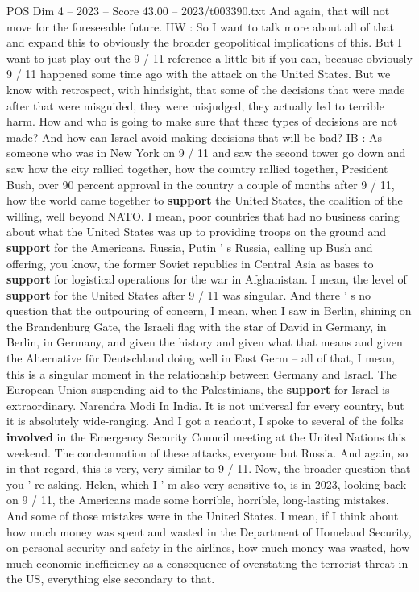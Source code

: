 \begin{textsample}{POS Dim 4 – 2023 – Score 43.00 – 2023/t003390.txt}
And again, that will not move for the foreseeable future.
HW : So I want to talk more about all of that and expand this to obviously the broader geopolitical implications of this.
But I want to just play out the 9 / 11 reference a little bit if you can, because obviously 9 / 11 happened some time ago with the attack on the United States.
But we know with retrospect, with hindsight, that some of the decisions that were made after that were misguided, they were misjudged, they actually led to terrible harm.
How and who is going to make sure that these types of decisions are not made?
And how can Israel avoid making decisions that will be bad?
IB : As someone who was in New York on 9 / 11 and saw the second tower go down and saw how the city rallied together, how the country rallied together, President Bush, over 90 percent approval in the country a couple of months after 9 / 11, how the world came together to \textbf{support} the United States, the coalition of the willing, well beyond NATO.
I mean, poor countries that had no business caring about what the United States was up to providing troops on the ground and \textbf{support} for the Americans.
Russia, Putin ' s Russia, calling up Bush and offering, you know, the former Soviet republics in Central Asia as bases to \textbf{support} for logistical operations for the war in Afghanistan.
I mean, the level of \textbf{support} for the United States after 9 / 11 was singular.
And there ' s no question that the outpouring of concern, I mean, when I saw in Berlin, shining on the Brandenburg Gate, the Israeli flag with the star of David in Germany, in Berlin, in Germany, and given the history and given what that means and given the Alternative für Deutschland doing well in East Germ -- all of that, I mean, this is a singular moment in the relationship between Germany and Israel.
The European Union suspending aid to the Palestinians, the \textbf{support} for Israel is extraordinary.
Narendra Modi In India.
It is not universal for every country, but it is absolutely wide-ranging.
And I got a readout, I spoke to several of the folks \textbf{involved} in the Emergency Security Council meeting at the United Nations this weekend.
The condemnation of these attacks, everyone but Russia.
And again, so in that regard, this is very, very similar to 9 / 11.
Now, the broader question that you ' re asking, Helen, which I ' m also very sensitive to, is in 2023, looking back on 9 / 11, the Americans made some horrible, horrible, long-lasting mistakes.
And some of those mistakes were in the United States.
I mean, if I think about how much money was spent and wasted in the Department of Homeland Security, on personal security and safety in the airlines, how much money was wasted, how much economic inefficiency as a consequence of overstating the terrorist threat in the US, everything else secondary to that.

\end{textsample}

